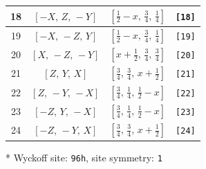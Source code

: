 \documentclass[fleqn,8pt]{jsarticle}
\begin{document}
\begin{longtable}{cccc}
18 & $\left[ - X,\, Z,\, - Y \right]$ & $\left[ \frac{1}{2} - x,\, \frac{3}{4},\, \frac{1}{4} \right]$ & {\tt [18]} \\ \hline
19 & $\left[ - X,\, - Z,\, Y \right]$ & $\left[ \frac{1}{2} - x,\, \frac{3}{4},\, \frac{1}{4} \right]$ & {\tt [19]} \\ \hline
20 & $\left[ X,\, - Z,\, - Y \right]$ & $\left[ x + \frac{1}{2},\, \frac{3}{4},\, \frac{3}{4} \right]$ & {\tt [20]} \\ \hline
21 & $\left[ Z,\, Y,\, X \right]$ & $\left[ \frac{3}{4},\, \frac{3}{4},\, x + \frac{1}{2} \right]$ & {\tt [21]} \\ \hline
22 & $\left[ Z,\, - Y,\, - X \right]$ & $\left[ \frac{3}{4},\, \frac{1}{4},\, \frac{1}{2} - x \right]$ & {\tt [22]} \\ \hline
23 & $\left[ - Z,\, Y,\, - X \right]$ & $\left[ \frac{3}{4},\, \frac{1}{4},\, \frac{1}{2} - x \right]$ & {\tt [23]} \\ \hline
24 & $\left[ - Z,\, - Y,\, X \right]$ & $\left[ \frac{3}{4},\, \frac{3}{4},\, x + \frac{1}{2} \right]$ & {\tt [24]} \\
\end{longtable}
* Wyckoff site: {\tt 96h}, site symmetry: {\tt 1}
\renewcommand{\arraystretch}{1.2}
\end{document}
